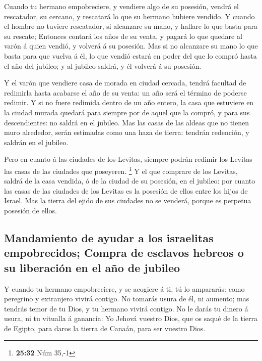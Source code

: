 Cuando tu hermano empobreciere, y vendiere algo de su
posesión, vendrá el rescatador, su cercano, y rescatará lo que su
hermano hubiere vendido.  Y cuando el hombre no tuviere
rescatador, si alcanzare su mano, y hallare lo que basta para su
rescate;  Entonces contará los años de su venta, y pagará
lo que quedare al varón á quien vendió, y volverá á su posesión.
 Mas si no alcanzare su mano lo que basta para que vuelva á
él, lo que vendió estará en poder del que lo compró hasta el año del
jubileo; y al jubileo saldrá, y él volverá á su posesión.

 Y el varón que vendiere casa de morada en ciudad cercada,
tendrá facultad de redimirla hasta acabarse el año de su venta: un año
será el término de poderse redimir.  Y si no fuere redimida
dentro de un año entero, la casa que estuviere en la ciudad murada
quedará para siempre por de aquel que la compró, y para sus
descendientes: no saldrá en el jubileo.  Mas las casas de
las aldeas que no tienen muro alrededor, serán estimadas como una haza
de tierra: tendrán redención, y saldrán en el jubileo.

 Pero en cuanto á las ciudades de los Levitas, siempre
podrán redimir los Levitas las casas de las ciudades que poseyeren.
\footnote{\textbf{25:32} Núm 35,-1}  Y el que comprare de
los Levitas, saldrá de la casa vendida, ó de la ciudad de su posesión,
en el jubileo: por cuanto las casas de las ciudades de los Levitas es la
posesión de ellos entre los hijos de Israel.  Mas la tierra
del ejido de sus ciudades no se venderá, porque es perpetua posesión de
ellos.

\hypertarget{mandamiento-de-ayudar-a-los-israelitas-empobrecidos-compra-de-esclavos-hebreos-o-su-liberaciuxf3n-en-el-auxf1o-de-jubileo}{%
\subsection{Mandamiento de ayudar a los israelitas empobrecidos; Compra
de esclavos hebreos o su liberación en el año de
jubileo}\label{mandamiento-de-ayudar-a-los-israelitas-empobrecidos-compra-de-esclavos-hebreos-o-su-liberaciuxf3n-en-el-auxf1o-de-jubileo}}

 Y cuando tu hermano empobreciere, y se acogiere á ti, tú
lo ampararás: como peregrino y extranjero vivirá contigo. 
No tomarás usura de él, ni aumento; mas tendrás temor de tu Dios, y tu
hermano vivirá contigo.  No le darás tu dinero á usura, ni
tu vitualla á ganancia:  Yo Jehová vuestro Dios, que os
saqué de la tierra de Egipto, para daros la tierra de Canaán, para ser
vuestro Dios.

